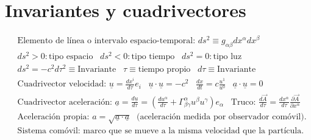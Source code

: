 \section*{Invariantes y cuadrivectores}
\begin{align*}
    &\text{Elemento de línea o intervalo espacio-temporal: } ds^2 \equiv g_{\alpha \beta}dx^\alpha dx^\beta\\
        &ds^2 >0 : \text{tipo espacio}\; \; \; ds^2<0:\text{tipo tiempo} \;\;\; ds^2 =0 : \text{tipo luz}\\
    &ds^2 =-c^2 d\tau ^2\equiv \text{Invariante}\; \; \;  \tau \equiv \text{tiempo propio} \;\;\; d\tau \equiv \text{Invariante}\\
    &\text{Cuadrivector velocidad: } \underline{u} = \frac{dx^i}{d\tau} e_i \; \; \; \underline{u} \cdot \underline{u} = -c^2 \;\; \; \frac{dx}{dt}=c\frac{u^1}{u^0}\; \; \; \underline{a}\cdot \underline{u} =0\\
    &\text{Cuadrivector aceleración: } \underline{a}\!=\! \frac{d\underline{u}}{d\tau}\!=\! \left(\frac{du^\alpha }{d\tau}+\Gamma^\alpha_{\beta \gamma}u^\beta u^\gamma\right) e_\alpha\;\; \; \text{Truco: }\!\frac{d\vec{A}}{d\tau}\!=\!\frac{dx^\alpha}{d\tau}\frac{\partial \vec{A}}{\partial x^\alpha}\\ 
    &\text{Aceleración propia: }a = \sqrt{\underline{a}\cdot \underline{a}}\;  \text{ (aceleración medida por observador comóvil).}\\
    &\text{Sistema comóvil: marco que se mueve a la misma velocidad que la partícula.}
\end{align*}

